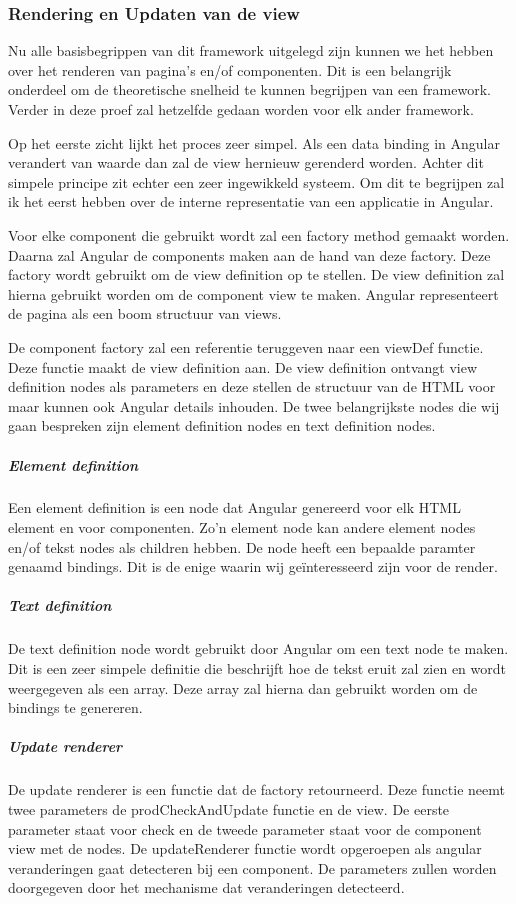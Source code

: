 \subsubsection{Rendering en Updaten van de view}
\label{sec:Angular_Rendering_Updaten}
Nu alle basisbegrippen van dit framework uitgelegd zijn kunnen we het hebben over het renderen van pagina’s en/of componenten. Dit is een belangrijk onderdeel om de theoretische snelheid te kunnen begrijpen van een framework. Verder in deze proef zal hetzelfde gedaan worden voor elk ander framework.

Op het eerste zicht lijkt het proces zeer simpel. Als een data binding in Angular verandert van waarde dan zal de view hernieuw gerenderd worden. Achter dit simpele principe zit echter een zeer ingewikkeld systeem. Om dit te begrijpen zal ik het eerst hebben over de interne representatie van een applicatie in Angular.

Voor elke component die gebruikt wordt zal een factory method gemaakt worden. Daarna zal Angular de components maken aan de hand van deze factory. Deze factory wordt gebruikt om de view definition op te stellen. De view definition zal hierna gebruikt worden om de component view te maken. Angular representeert de pagina als een boom structuur van views.

De component factory zal een referentie teruggeven naar een viewDef functie. Deze functie maakt de view definition aan. De view definition ontvangt view definition nodes als parameters en deze stellen de structuur van de HTML voor maar kunnen ook Angular details inhouden. De twee belangrijkste nodes die wij gaan bespreken zijn element definition nodes en text definition nodes.

\subparagraph{Element definition}
Een element definition is een node dat Angular genereerd voor elk HTML element en voor componenten. Zo’n element node kan andere element nodes en/of tekst nodes als children hebben. De node heeft een bepaalde paramter genaamd bindings. Dit is de enige waarin wij geïnteresseerd zijn voor de render.

\subparagraph{Text definition}
De text definition node wordt gebruikt door Angular om een text node te maken. Dit is een zeer simpele definitie die beschrijft hoe de tekst eruit zal zien en wordt weergegeven als een array. Deze array zal hierna dan gebruikt worden om de bindings te genereren.

\subparagraph{Update renderer}
De update renderer is een functie dat de factory retourneerd. Deze functie neemt twee parameters de prodCheckAndUpdate functie en de view. De eerste parameter staat voor check en de tweede parameter staat voor de component view met de nodes. De updateRenderer functie wordt opgeroepen als angular veranderingen gaat detecteren bij een component. De parameters zullen worden doorgegeven door het mechanisme dat veranderingen detecteerd.

